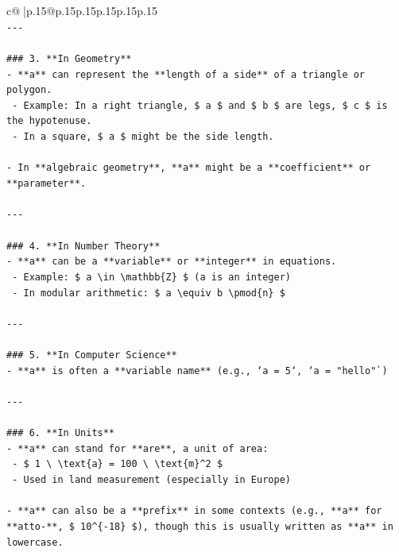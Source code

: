 \documentclass{article}
\begin{document}
{\begin{supertabular}{c@{$\;$}|p{.15\linewidth}@{}p{.15\linewidth}p{.15\linewidth}p{.15\linewidth}p{.15\linewidth}p{.15\linewidth}}
{{{\\ 
\texttt{{-}{-}{-}} \\
\\ 
\texttt{\#\#\# 3. **In Geometry**} \\
\texttt{{-} **a** can represent the **length of a side** of a triangle or polygon.} \\
\texttt{  {-} Example: In a right triangle, \$ a \$ and \$ b \$ are legs, \$ c \$ is the hypotenuse.} \\
\texttt{  {-} In a square, \$ a \$ might be the side length.} \\
\\ 
\texttt{{-} In **algebraic geometry**, **a** might be a **coefficient** or **parameter**.} \\
\\ 
\texttt{{-}{-}{-}} \\
\\ 
\texttt{\#\#\# 4. **In Number Theory**} \\
\texttt{{-} **a** can be a **variable** or **integer** in equations.} \\
\texttt{  {-} Example: \$ a \textbackslash{}in \textbackslash{}mathbb\{Z\} \$ (a is an integer)} \\
\texttt{  {-} In modular arithmetic: \$ a \textbackslash{}equiv b \textbackslash{}pmod\{n\} \$} \\
\\ 
\texttt{{-}{-}{-}} \\
\\ 
\texttt{\#\#\# 5. **In Computer Science**} \\
\texttt{{-} **a** is often a **variable name** (e.g., `a = 5`, `a = "hello"`)} \\
\\ 
\texttt{{-}{-}{-}} \\
\\ 
\texttt{\#\#\# 6. **In Units**} \\
\texttt{{-} **a** can stand for **are**, a unit of area:} \\
\texttt{  {-} \$ 1 \textbackslash{} \textbackslash{}text\{a\} = 100 \textbackslash{} \textbackslash{}text\{m\}\^{}2 \$} \\
\texttt{  {-} Used in land measurement (especially in Europe)} \\
\\ 
\texttt{{-} **a** can also be a **prefix** in some contexts (e.g., **a** for **atto{-}**, \$ 10\^{}\{{-}18\} \$), though this is usually written as **a** in lowercase.} \\
}}}
\end{supertabular}}
\end{document}
